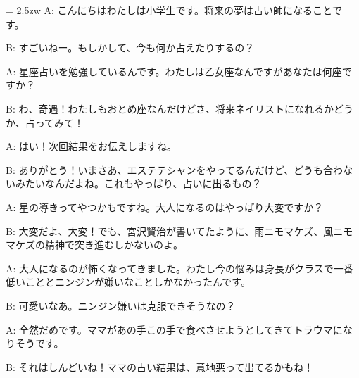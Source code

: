 \documentclass[11pt]{amsart}
\title{}
\author{}
\newenvironment{hangall}[1]{\hangindent = 2.5zw\everypar{\hangindent = 2.5zw}}{}
\begin{document}
\maketitle
\begin{hangall}{}%
A: こんにちはわたしは小学生です。将来の夢は占い師になることです。

B: すごいねー。もしかして、今も何か占えたりするの？

A: 星座占いを勉強しているんです。わたしは乙女座なんですがあなたは何座ですか？

B: わ、奇遇！わたしもおとめ座なんだけどさ、将来ネイリストになれるかどうか、占ってみて！

A: はい！次回結果をお伝えしますね。

B: ありがとう！いまさあ、エステテシャンをやってるんだけど、どうも合わないみたいなんだよね。これもやっぱり、占いに出るもの？

A: 星の導きってやつかもですね。大人になるのはやっぱり大変ですか？

B: 大変だよ、大変！でも、宮沢賢治が書いてたように、雨ニモマケズ、風ニモマケズの精神で突き進むしかないのよ。

A: 大人になるのが怖くなってきました。わたし今の悩みは身長がクラスで一番低いこととニンジンが嫌いなことしかなかったんです。

B: 可愛いなあ。ニンジン嫌いは克服できそうなの？

A: 全然だめです。ママがあの手この手で食べさせようとしてきてトラウマになりそうです。

B: \ul{それはしんどいね！ママの占い結果は、意地悪って出てるかもね！}\end{hangall}
\end{document}
